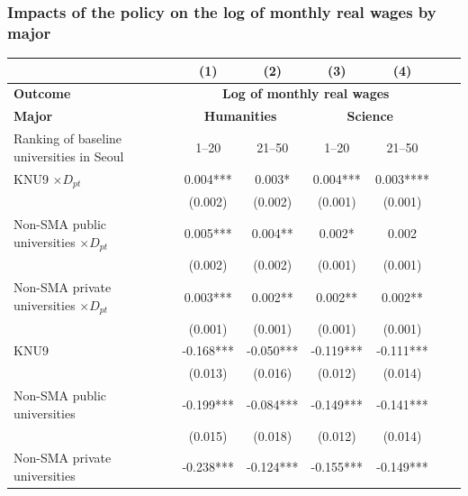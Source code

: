 \documentclass[aspectratio=169,xcolor=dvipsnames,handout]{beamer}
\begin{document}
\begin{frame}
    \frametitle{Impacts of the policy on the log of monthly real wages by major}
    \begin{table}[ht]
        \tiny
        \centering
        \begin{tabular}{lcccccc}
        \toprule
        & \textbf{(1)} & \textbf{(2)} & \textbf{(3)} & \textbf{(4)} \\
        \midrule
        \textbf{Outcome} & \multicolumn{4}{c}{\textbf{Log of monthly real wages}} \\
        \midrule
        \textbf{Major} & \multicolumn{2}{c}{\textbf{Humanities}}& \multicolumn{2}{c}{\textbf{Science}} \\
        \midrule                                                                                  
        Ranking of baseline universities in Seoul    & 1--20     & 21--50    & 1--20     & 21--50    \\
        \midrule                                                          
        KNU9 $\times D_{pt}$                         & 0.004***  & 0.003*    & 0.004***  & 0.003**** \\
                                                     & (0.002)   & (0.002)   & (0.001)   & (0.001)   \\
        Non-SMA public universities $\times D_{pt}$  & 0.005***  & 0.004**   & 0.002*    & 0.002     \\
                                                     & (0.002)   & (0.002)   & (0.001)   & (0.001)   \\
        Non-SMA private universities $\times D_{pt}$ & 0.003***  & 0.002**   & 0.002**   & 0.002**   \\
                                                     & (0.001)   & (0.001)   & (0.001)   & (0.001)   \\
        KNU9                                         & -0.168*** & -0.050*** & -0.119*** & -0.111*** \\
                                                     & (0.013)   & (0.016)   & (0.012)   & (0.014)   \\
        Non-SMA public universities                  & -0.199*** & -0.084*** & -0.149*** & -0.141*** \\
                                                     & (0.015)   & (0.018)   & (0.012)   & (0.014)   \\
        Non-SMA private universities                 & -0.238*** & -0.124*** & -0.155*** & -0.149*** \\

\end{tabular}
\end{table}
\end{frame}
\end{document}
